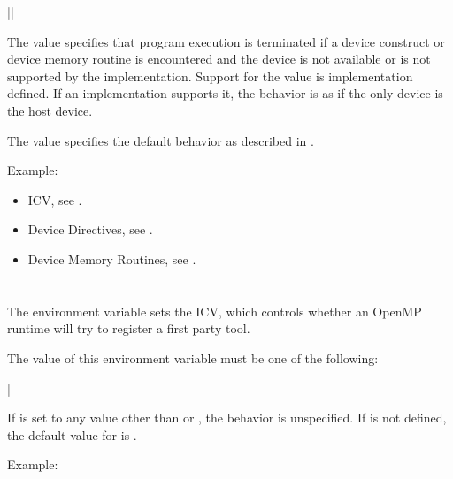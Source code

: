 {||}

The  value specifies that program execution is terminated if 
a device construct or device memory routine is encountered and the device is 
not available or is not supported by the implementation. Support for the 
 value is implementation defined.  If an implementation supports 
it, the behavior is as if the only device is the host device.

The  value specifies the default behavior as described in 
.

Example:
\begin{ompEnv}
\end{ompEnv}

\crossreferences
\begin{itemize}
\item {} ICV, see .

\item Device Directives, see .

\item Device Memory Routines, see .
\end{itemize}



\section{}
\label{sec:OMP_TOOL}

The  environment variable sets the  ICV, which 
controls whether an OpenMP runtime will try to register a first party tool.

The value of this environment variable must be one of the following:

{|}

If  is set to any value other than  or 
, the behavior is unspecified. If  is not 
defined, the default value for  is .

Example:
\begin{ompEnv}
\end{ompEnv}

